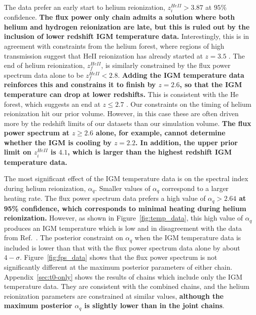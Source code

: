 The data prefer an early start to helium reionization, $z_i^{HeII} > 3.87$ at $95\%$ confidence. \textbf{The flux power only chain admits a solution where both helium and hydrogen reionization are late, but this is ruled out by the inclusion of lower redshift IGM temperature data.}
Interestingly, this is in agreement with constraints from the helium \lya forest, where regions of high transmission suggest that HeII reionization has already started at $z = 3.5$ \cite{2016ApJ...825..144W, 2021ApJ...912...38M}.
The end of helium reionization, $z_f^{HeII}$, is similarly constrained by the flux power spectrum data alone to be $z_f^{HeII} < 2.8$. \textbf{Adding the IGM temperature data reinforces this and constrains it to finish by $z=2.6$, so that the IGM temperature can drop at lower redshifts. }
This is consistent with the He~{} \lya forest, which suggests an end at $z \leq 2.7$ \cite{2009ApJ...704L..89M, 2011ApJ...733L..24W, 2019ApJ...875..111W}.
Our constraints on the timing of helium reionization hit our prior volume. However, in this case these are often driven more by the redshift limits of our datasets than our simulation volume. \textbf{The flux power spectrum at $z\geq  2.6$ alone, for example, cannot determine whether the IGM is cooling by $z=2.2$. In addition, the upper prior limit on $z^{HeII}_i$ is $4.1$, which is larger than the highest redshift IGM temperature data.}

The most significant effect of the IGM temperature data is on the spectral index during helium reionization, $\alpha_q$.
Smaller values of $\alpha_q$ correspond to a larger heating rate.
The flux power spectrum data prefers a high value of \textbf{$\alpha_q > 2.64$ at 95\% confidence, which corresponds to minimal heating during helium reionization.}
However, as shown in Figure~\ref{fig:temp_data}, this high value of $\alpha_q$ produces an IGM temperature which is low and in disagreement with the data from Ref.~\cite{2021MNRAS.506.4389G}. The posterior constraint on $\alpha_q$ when the IGM temperature data is included is lower than that with the flux power spectrum data alone by about $4-\sigma$.
Figure~\ref{fig:fps_data} shows that the flux power spectrum is not significantly different at the maximum posterior parameters of either chain.
Appendix~\ref{sec:t0-only} shows the results of chains which include only the IGM temperature data.
They are consistent with the combined chains, and the helium reionization parameters are constrained at similar values, \textbf{although the maximum posterior $\alpha_q$ is slightly lower than in the joint chains}.

